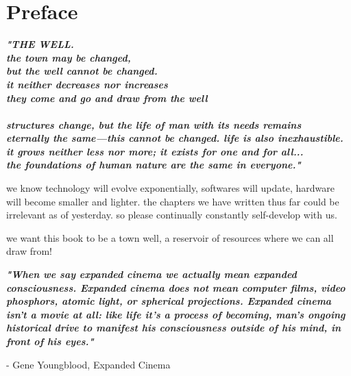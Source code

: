 
\SkipTocEntry\chapter*{Preface}
\addtocounter{section}{1}
\begin{fullwidth}

{\itshape\bfseries "THE WELL.
\\
the town may be changed,
\\
but the well cannot be changed.
\\
it neither decreases nor increases
\\
they come and go and draw from the well
\\
\\
structures change, but the life of man with its needs remains
\\
eternally the same—this cannot be changed. life is also inexhaustible. 
\\
it grows neither less nor more; it exists for one and for all...
\\
the foundations of human nature are the same in everyone."

}

we know technology will evolve exponentially, softwares will update, hardware will become smaller and lighter. the chapters we have written thus far could be irrelevant as of yesterday. so please continually constantly self-develop with us. 

we want this book to be a town well, a reservoir of resources where we can all draw from!

{\itshape\bfseries "When we say expanded cinema we actually mean expanded consciousness. Expanded cinema does not mean computer films, video phosphors, atomic light, or spherical projections. Expanded cinema isn't a movie at all: like life it's a process of becoming, man's ongoing historical drive to manifest his consciousness outside of his mind, in front of his eyes."}

- Gene Youngblood, Expanded Cinema
\vspace{\baselineskip}


\clearpage
\end{fullwidth}
